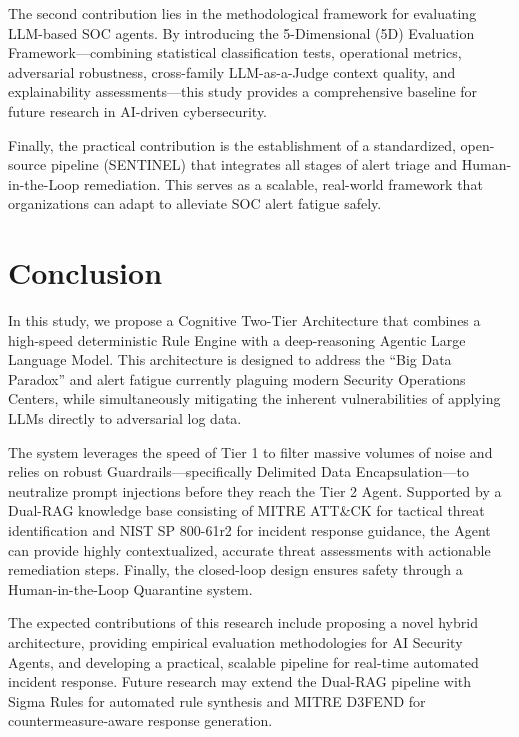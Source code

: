 \documentclass[12pt,a4paper]{article}
\begin{document}
The second contribution lies in the methodological framework for evaluating LLM-based SOC agents. By introducing the 5-Dimensional (5D) Evaluation Framework—combining statistical classification tests, operational metrics, adversarial robustness, cross-family LLM-as-a-Judge context quality, and explainability assessments—this study provides a comprehensive baseline for future research in AI-driven cybersecurity.

Finally, the practical contribution is the establishment of a standardized, open-source pipeline (SENTINEL) that integrates all stages of alert triage and Human-in-the-Loop remediation. This serves as a scalable, real-world framework that organizations can adapt to alleviate SOC alert fatigue safely.

\newpage
\section{Conclusion}
In this study, we propose a Cognitive Two-Tier Architecture that combines a high-speed deterministic Rule Engine with a deep-reasoning Agentic Large Language Model. This architecture is designed to address the ``Big Data Paradox'' and alert fatigue currently plaguing modern Security Operations Centers, while simultaneously mitigating the inherent vulnerabilities of applying LLMs directly to adversarial log data.

The system leverages the speed of Tier 1 to filter massive volumes of noise and relies on robust Guardrails—specifically Delimited Data Encapsulation—to neutralize prompt injections before they reach the Tier 2 Agent. Supported by a Dual-RAG knowledge base consisting of MITRE ATT\&CK for tactical threat identification and NIST SP 800-61r2 for incident response guidance, the Agent can provide highly contextualized, accurate threat assessments with actionable remediation steps. Finally, the closed-loop design ensures safety through a Human-in-the-Loop Quarantine system.

The expected contributions of this research include proposing a novel hybrid architecture, providing empirical evaluation methodologies for AI Security Agents, and developing a practical, scalable pipeline for real-time automated incident response. Future research may extend the Dual-RAG pipeline with Sigma Rules for automated rule synthesis and MITRE D3FEND for countermeasure-aware response generation.
\end{document}
